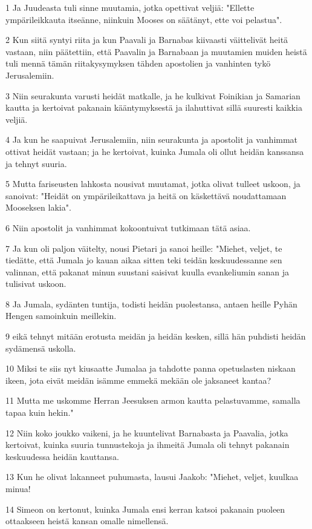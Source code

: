 \par 1 Ja Juudeasta tuli sinne muutamia, jotka opettivat veljiä: "Ellette ympärileikkauta itseänne, niinkuin Mooses on säätänyt, ette voi pelastua".
\par 2 Kun siitä syntyi riita ja kun Paavali ja Barnabas kiivaasti väittelivät heitä vastaan, niin päätettiin, että Paavalin ja Barnabaan ja muutamien muiden heistä tuli mennä tämän riitakysymyksen tähden apostolien ja vanhinten tykö Jerusalemiin.
\par 3 Niin seurakunta varusti heidät matkalle, ja he kulkivat Foinikian ja Samarian kautta ja kertoivat pakanain kääntymyksestä ja ilahuttivat sillä suuresti kaikkia veljiä.
\par 4 Ja kun he saapuivat Jerusalemiin, niin seurakunta ja apostolit ja vanhimmat ottivat heidät vastaan; ja he kertoivat, kuinka Jumala oli ollut heidän kanssansa ja tehnyt suuria.
\par 5 Mutta fariseusten lahkosta nousivat muutamat, jotka olivat tulleet uskoon, ja sanoivat: "Heidät on ympärileikattava ja heitä on käskettävä noudattamaan Mooseksen lakia".
\par 6 Niin apostolit ja vanhimmat kokoontuivat tutkimaan tätä asiaa.
\par 7 Ja kun oli paljon väitelty, nousi Pietari ja sanoi heille: "Miehet, veljet, te tiedätte, että Jumala jo kauan aikaa sitten teki teidän keskuudessanne sen valinnan, että pakanat minun suustani saisivat kuulla evankeliumin sanan ja tulisivat uskoon.
\par 8 Ja Jumala, sydänten tuntija, todisti heidän puolestansa, antaen heille Pyhän Hengen samoinkuin meillekin.
\par 9 eikä tehnyt mitään erotusta meidän ja heidän kesken, sillä hän puhdisti heidän sydämensä uskolla.
\par 10 Miksi te siis nyt kiusaatte Jumalaa ja tahdotte panna opetuslasten niskaan ikeen, jota eivät meidän isämme emmekä mekään ole jaksaneet kantaa?
\par 11 Mutta me uskomme Herran Jeesuksen armon kautta pelastuvamme, samalla tapaa kuin hekin."
\par 12 Niin koko joukko vaikeni, ja he kuuntelivat Barnabasta ja Paavalia, jotka kertoivat, kuinka suuria tunnustekoja ja ihmeitä Jumala oli tehnyt pakanain keskuudessa heidän kauttansa.
\par 13 Kun he olivat lakanneet puhumasta, lausui Jaakob: "Miehet, veljet, kuulkaa minua!
\par 14 Simeon on kertonut, kuinka Jumala ensi kerran katsoi pakanain puoleen ottaakseen heistä kansan omalle nimellensä.
